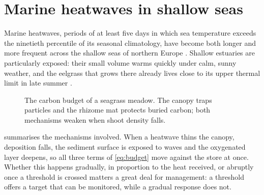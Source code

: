\section{Marine heatwaves in shallow seas}
\label{sec:heatwaves}

Marine heatwaves, periods of at least five days in which sea temperature
exceeds the ninetieth percentile of its seasonal climatology, have become
both longer and more frequent across the shallow seas of northern Europe
\parencite{marsh2021heatwaves}. Shallow estuaries are particularly
exposed: their small volume warms quickly under calm, sunny weather, and
the eelgrass that grows there already lives close to its upper thermal
limit in late summer \parencite{okafor2018thermal}.

\begin{figure}[tb]
  \centering
  \caption{The carbon budget of a seagrass meadow. The canopy traps
    particles and the rhizome mat protects buried carbon; both
    mechanisms weaken when shoot density falls.}
  \label{fig:budget}
\end{figure}

 summarises the mechanisms involved. When a heatwave
thins the canopy, deposition falls, the sediment surface is exposed to
waves and the oxygenated layer deepens, so all three terms of
\cref{eq:budget} move against the store at once. Whether this happens
gradually, in proportion to the heat received, or abruptly once a
threshold is crossed matters a great deal for management: a threshold
offers a target that can be monitored, while a gradual response does
not.

